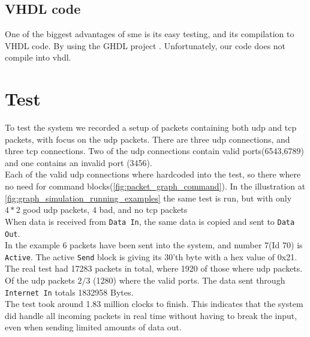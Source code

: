 \subsection{VHDL code}
One of the biggest advantages of \gls{sme} is its easy testing, and its
compilation to VHDL code. By using the GHDL project
\cite{github_ghdl}.
Unfortunately, our code does not compile into \gls{vhdl}.


\section{Test}
To test the system we recorded a setup of packets containing both \gls{udp} and
\gls{tcp} packets, with focus on the \gls{udp} packets. There are three
\gls{udp} connections, and three \gls{tcp} connections. Two of the \gls{udp}
connections contain valid ports(6543,6789) and one contains an invalid port (3456).\\
Each of the valid udp connections where hardcoded into the test, so there where no
need for command blocks(\autoref{fig:packet_graph_command}).
In the illustration at \autoref{fig:graph_simulation_running_examples} the
same test is run, but with only $4*2$ good \gls{udp} packets, $4$ bad, and
no \gls{tcp} packets\\
When data is received from \texttt{Data In}, the same data is copied and
sent to \texttt{Data Out}. \\
In the example 6 packets have been sent into the system, and number 7(Id 70)
is \texttt{Active}. The active \texttt{Send} block is giving its 30'th byte
with a hex value of 0x21.\\
The real test had 17283 packets in total, where 1920 of those where udp packets.
Of the udp packets $2/3$ (1280) where the valid ports. The data sent
through \texttt{Internet In} totals 1832958 Bytes.\\
The test took around 1.83 million clocks to finish. This indicates that the system
did handle all incoming packets in real time without having to break the input,
even when sending limited amounts of data out.



